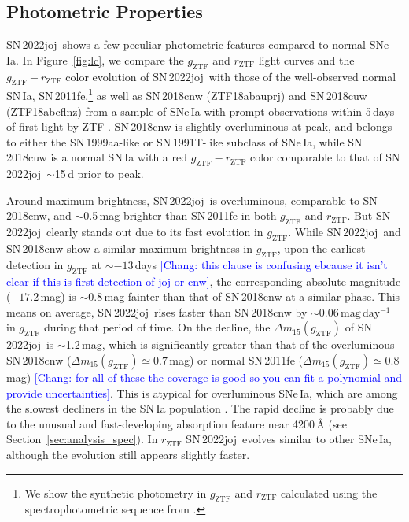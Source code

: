 \documentclass[twocolumn]{aastex631}
\newcommand{\sn}{SN\,2022joj}
\newcommand{\chang}[1]{\textcolor{blue}{[Chang: #1]}}
\begin{document}
\begin{CJK*}{UTF8}{gbsn}
\subsection{Photometric Properties} \label{sec:analysis_phot}
\sn\ shows a few peculiar photometric features compared to normal SNe\,Ia. In Figure~\ref{fig:lc}, we compare the $g_\mathrm{ZTF}$ and $r_\mathrm{ZTF}$ light curves and the $g_\mathrm{ZTF} - r_\mathrm{ZTF}$ color evolution of \sn\ with those of the well-observed normal SN\,Ia, SN\,2011fe,\footnote{We show the synthetic photometry in $g_\mathrm{ZTF}$ and $r_\mathrm{ZTF}$ calculated using the spectrophotometric sequence from \citet{Pereira_2013}.} as well as SN\,2018cnw (ZTF18abauprj) and SN\,2018cuw (ZTF18abcflnz) from a sample of SNe\,Ia with prompt observations within 5\,days of first light by ZTF \citep{Yao_2019,Bulla2020}. 
SN\,2018cnw is slightly overluminous at peak, and belongs to either the SN\,1999aa-like \citep[99aa-like;][]{Garavini_99aa_2004} or SN\,1991T-like \citep[91T-like;][]{Filippenko_91T_1992} subclass of SNe\,Ia, while SN\,2018cuw is a normal SN\,Ia with a red $g_\mathrm{ZTF} - r_\mathrm{ZTF}$ color comparable to that of \sn\ $\sim$15\,d prior to peak. 

Around maximum brightness, \sn\ is overluminous, comparable to SN\,2018cnw, and $\sim$0.5\,mag brighter than SN\,2011fe in both $g_\mathrm{ZTF}$ and $r_\mathrm{ZTF}$. But \sn\ clearly stands out due to its fast evolution in $g_\mathrm{ZTF}$. While \sn\ and SN\,2018cnw show a similar maximum brightness in $g_\mathrm{ZTF}$, upon the earliest detection in $g_\mathrm{ZTF}$ at $\sim$$-13$\,days \chang{this clause is confusing ebcause it isn't clear if this is first detection of joj or cnw}, the corresponding absolute magnitude ($-17.2$\,mag) is $\sim$0.8\,mag fainter than that of SN\,2018cnw at a similar phase. This means on average, \sn\ rises faster than SN\,2018cnw by $\sim$$0.06\,\mathrm{mag\,day^{-1}}$ in $g_\mathrm{ZTF}$ during that period of time. On the decline, the $\Delta m_{15}(g_\mathrm{ZTF})$ of \sn\ is $\sim$1.2\,mag, which is significantly greater than that of the overluminous SN\,2018cnw ($\Delta m_{15}(g_\mathrm{ZTF})\simeq0.7$\,mag) or normal SN\,2011fe ($\Delta m_{15}(g_\mathrm{ZTF})\simeq0.8$\,mag) \chang{for all of these the coverage is good so you can fit a polynomial and provide uncertainties}. This is atypical for overluminous SNe\,Ia, which are among the slowest decliners in the SN\,Ia population \citep{Phillips_1999, Taubenberger_2017}. The rapid decline is probably due to the unusual and fast-developing absorption feature near 4200\,\r{A} (see Section~\ref{sec:analysis_spec}). In $r_\mathrm{ZTF}$ \sn\ evolves similar to other SNe\,Ia, although the evolution still appears slightly faster.


\end{CJK*}
\end{document}
